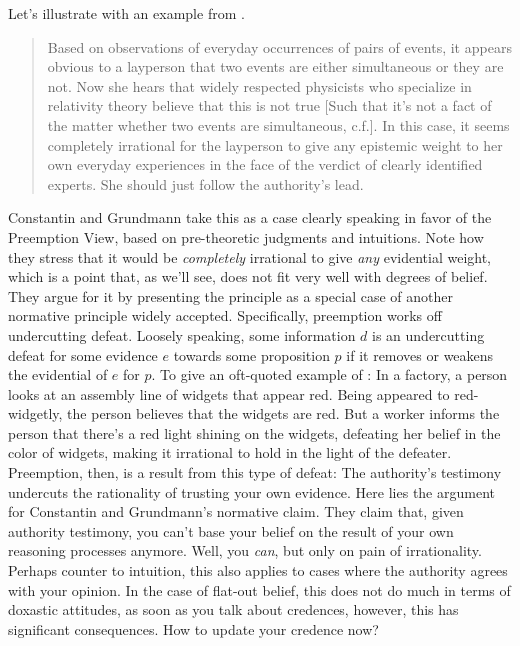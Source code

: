 \documentclass[11pt, a4paper]{scrartcl}
\renewcommand{\i}[1]{\emph{#1}}
\begin{document}
Let's illustrate with an example from \textcite{Constantin2017}. 

\begin{singlespacing}
\begin{quote}
    Based on observations of everyday occurrences of pairs of events, it appears obvious to a layperson that two events are either simultaneous or they are not. Now she hears that widely respected physicists who specialize in relativity theory believe that this is not true [Such that it's not a fact of the matter whether two events are simultaneous, c.f.]. In this case, it seems completely irrational for the layperson to give any epistemic weight to her own everyday experiences in the face of the verdict of clearly identified experts. She should just follow the authority's lead. 
\end{quote}
\end{singlespacing}

Constantin and Grundmann take this as a case clearly speaking in favor of the Preemption View, based on pre-theoretic judgments and intuitions. Note how they stress that it would be \i{completely} irrational to give \i{any} evidential weight, which is a point that, as we'll see, does not fit very well with degrees of belief. They argue for it by presenting the principle as a special case of another normative principle widely accepted. Specifically, preemption works off undercutting defeat. Loosely speaking, some information $d$ is an undercutting defeat for some evidence $e$ towards some proposition $p$ if it removes or weakens the evidential of $e$ for $p$. To give an oft-quoted example of \textcite{Pollock1986}: In a factory, a person looks at an assembly line of widgets that appear red. Being appeared to red-widgetly, the person believes that the widgets are red. But a worker informs the person that there's a red light shining on the widgets, defeating her belief in the color of widgets, making it irrational to hold in the light of the defeater. Preemption, then, is a result from this type of defeat: The authority's testimony undercuts the rationality of trusting your own evidence. Here lies the argument for Constantin and Grundmann's normative claim. They claim that, given authority testimony, you can't base your belief on the result of your own reasoning processes anymore. Well, you \i{can}, but only on pain of irrationality. Perhaps counter to intuition, this also applies to cases where the authority agrees with your opinion. In the case of flat-out belief, this does not do much in terms of doxastic attitudes, as soon as you talk about credences, however, this has significant consequences. How to update your credence now?   
\end{document}
